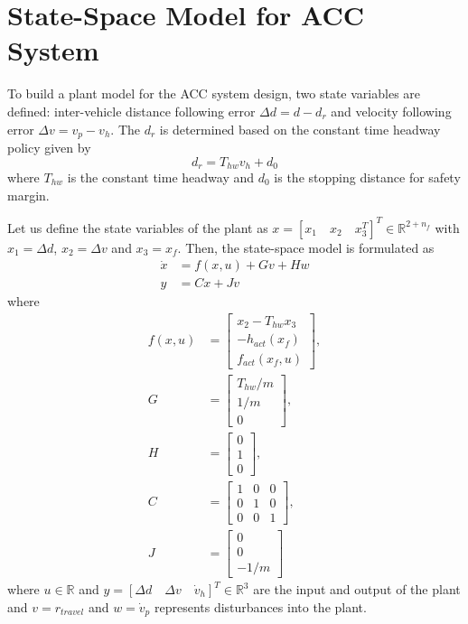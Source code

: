 \documentclass{report}
\begin{document}
\section{State-Space Model for ACC System}
To build a plant model for the ACC system design, two state variables are defined: inter-vehicle distance following error \(\Delta d = d - d_r\) and velocity following error \(\Delta v = v_p - v_h\). The \(d_r\) is determined based on the constant time headway policy given by
\begin{equation}
    d_r = T_{hw}v_h + d_0
\end{equation}
where \(T_{hw}\) is the constant time headway and \(d_0\) is the stopping distance for safety margin.

Let us define the state variables of the plant as \(x = [x_1 \quad x_2 \quad x_3^T]^T \in \mathbb{R}^{2+n_f}\) with \(x_1 = \Delta d\), \(x_2 = \Delta v\) and \(x_3 = x_f\). Then, the state-space model is formulated as
\begin{align}
    \dot{x} & = f(x, u) + Gv + Hw \\
    y       & = Cx + Jv
\end{align}
where
\begin{align*}
    f(x, u) & = \begin{bmatrix}
                    x_2 - T_{hw}x_3 \\
                    -h_{act}(x_f)   \\
                    f_{act}(x_f, u)
                \end{bmatrix}, \\
    G       & = \begin{bmatrix}
                    T_{hw}/m \\
                    1/m      \\
                    0
                \end{bmatrix},           \\
    H       & = \begin{bmatrix}
                    0 \\
                    1 \\
                    0
                \end{bmatrix},           \\
    C       & = \begin{bmatrix}
                    1 & 0 & 0 \\
                    0 & 1 & 0 \\
                    0 & 0 & 1
                \end{bmatrix},           \\
    J       & = \begin{bmatrix}
                    0 \\
                    0 \\
                    -1/m
                \end{bmatrix}
\end{align*}
where \(u \in \mathbb{R}\) and \(y = [\Delta d \quad \Delta v \quad \dot{v}_h]^T \in \mathbb{R}^3\) are the input and output of the plant and \(v = r_{travel}\) and \(w = \dot{v}_p\) represents disturbances into the plant.
\end{document}
